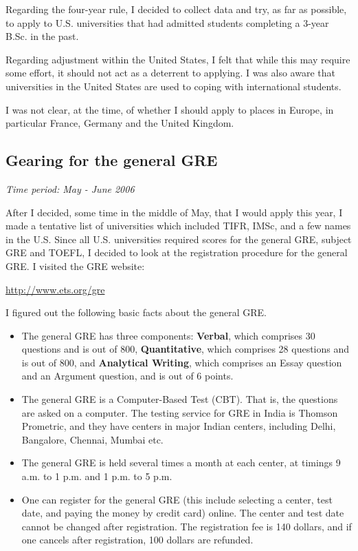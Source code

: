 \documentclass[a4paper]{amsart}
\begin{document}
\begin{enumerate}
  Regarding the four-year rule, I decided to collect data and try, as
  far as possible, to apply to U.S. universities that had admitted students
  completing a 3-year B.Sc. in the past. 

  Regarding adjustment within the United States, I felt that while
  this may require some effort, it should not act as a deterrent to
  applying. I was also aware that universities in the United States are used
  to coping with international students.

  I was not clear, at the time, of whether I should apply to places in Europe,
  in particular France, Germany and the United Kingdom.

\end{enumerate}

\subsection{Gearing for the general GRE}

{\em Time period: May - June 2006}

After I decided, some time in the middle of May, that I would apply
this year, I made a tentative list of universities which included
TIFR, IMSc, and a few names in the U.S. Since all U.S. universities
required scores for the general GRE, subject GRE and TOEFL, I decided
to look at the registration procedure for the general GRE. I visited
the GRE website:

\url{http://www.ets.org/gre}

I figured out the following basic facts about the general GRE.

\begin{itemize}

\item The general GRE has three components: {\bf Verbal}, which
  comprises 30 questions and is out of 800, {\bf Quantitative}, which
  comprises 28 questions and is out of 800, and {\bf Analytical
    Writing}, which comprises an Essay question and an Argument
  question, and is out of 6 points.

\item The general GRE is a Computer-Based Test (CBT). That is, the
  questions are asked on a computer. The testing service
  for GRE in India is Thomson Prometric, and they have centers
  in major Indian centers, including Delhi, Bangalore, Chennai, Mumbai etc.

\item The general GRE is held several times a month at each center,
  at timings 9 a.m. to 1 p.m. and 1 p.m. to 5 p.m.

\item One can register for the general GRE (this include selecting a
  center, test date, and paying the money by credit card) online.
  The center and test date cannot be changed after registration.
  The registration fee is 140 dollars, and if one cancels after registration,
  100 dollars are refunded.

\end{itemize}
\end{document}
